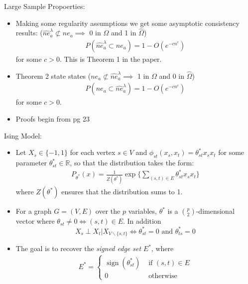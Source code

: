 \documentclass[xcolor=dvipsnames,aspectratio=1610]{beamer}
\DeclareMathOperator*{\sign}{sign}
\theoremstyle{remark}
\begin{document}
\begin{frame}{Large Sample Propoerties:}
  \begin{itemize}
    \setlength{\itemsep}{10pt}
\item Making some regularity assumptions we get some asymptotic consistency results: ($\hat{ne}^{\lambda}_a \not \subset ne_a \implies $ 0 in $\Omega$ and 1 in $\hat{\Omega}$)
\begin{align*}
P(\hat{ne}^{\lambda}_a \subset ne_a) = 1 - O(e^{-cn^{\epsilon}})
\end{align*}
for some $c>0$. This is Theorem 1 in the paper.
\item Theorem 2 state states ($ne_a  \not \subset \hat{ne}^{\lambda}_a \implies $ 1 in $\Omega$ and 0 in $\hat{\Omega}$)
\begin{align*}
P(ne_a \subset \hat{ne}^{\lambda}_a) = 1 - O(e^{-cn^{\epsilon}})
\end{align*}
for some $c>0$. 
\item Proofs begin from pg 23
  \end{itemize}
\end{frame}

\begin{frame}{Ising Model:}
  \begin{itemize}
    \setlength{\itemsep}{10pt}
\item Let $X_s \in \{-1,1\}$ for each vertex $s \in V$ and $\phi_{st}(x_s,x_t) = \theta^*_{st} x_s x_t$ for some parameter $\theta^*_{st} \in \mathbb{R}$, so that the distribution takes the form:
\begin{align*}
P_{\theta^*} (x) = \frac{1}{Z(\theta^*)} \exp \{ \sum_{(s,t) \in E} \theta^*_{st} x_s x_t \}
\end{align*}
where $Z(\theta^*)$ ensures that the distribution sums to 1.
\item For a graph $G = (V,E)$ over the $p$ variables, $\theta^*$ is a ${p \choose 2}$-dimensional vector where $\theta_{st} \neq 0 \iff (s,t) \in E$. In addition 
$$
X_s \perp X_t | X_{ V \backslash \{s,t\}} \iff \theta^*_{st} = 0 \text{ and } \theta^*_{ts} = 0
$$
\item The goal is to recover the \textit{signed edge set} $E^*$, where
\begin{align*}
E^* = \begin{cases}
\sign (\theta^*_{st}) & \text{ if } (s,t) \in E \\
0 & \text{ otherwise }
\end{cases}
\end{align*}
  \end{itemize}
\end{frame}
\end{document}
